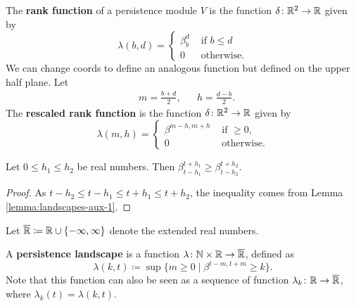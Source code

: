 \begin{definition}
    The {\bf rank function} of a persistence module $ V $ is the function $ \delta \colon \mathbb R^2 \to \mathbb R $ given by
    \begin{equation}
        \lambda(b, d) = \begin{cases}
            \beta_b^d &\text{ if }  b \leq d \\
            0 &\text{ otherwise}.
        \end{cases}
    \end{equation}
    We can change coords to define an analogous function but defined on the upper half plane. Let
    \begin{align}
        &m = \frac{b + d}{2}, & &h = \frac{d-b}{2}.
    \end{align}
    The {\bf rescaled rank function} is the function $ \delta \colon \mathbb R^2 \to \mathbb R $ given by
    \begin{equation}
        \lambda(m, h) = \begin{cases}
        \beta^{m-h, m+h} &\text{ if } \geq 0,\\
        0 & \text{ otherwise}.
        \end{cases}
    \end{equation}
\end{definition}

\begin{lemma} \label{lemma:landscapes-aux-2}
    Let $ 0 \leq h_1 \leq h_2 $ be real numbers. Then $ \beta_{t-h_1}^{t+h_1} \geq \beta_{t-h_2}^{t+h_2} $.
\end{lemma}
\begin{proof}
    As $ t - h_2 \leq t-h_1 \leq t+h_1 \leq t+h_2$, the inequality comes from Lemma \ref{lemma:landscapes-aux-1}.
\end{proof}

Let $ \overline{\mathbb R} \coloneq \mathbb R \cup \{-\infty, \infty\} $ denote the extended real numbers. 

\begin{definition} \label{def:persistence-landscape}
    A {\bf persistence landscape} is a function $ \lambda \colon \mathbb N \times \mathbb R \to \overline {\mathbb R} $, defined as
    \begin{equation}
        \lambda(k, t) \coloneq \sup \{ m \geq 0 \mid \beta^{t-m, t+m} \geq k\}.
    \end{equation}
    Note that this function can also be seen as a sequence of function $ \lambda_k \colon \mathbb R \to \overline{\mathbb R} $, where $ \lambda_k(t) = \lambda(k, t) $.
\end{definition}

